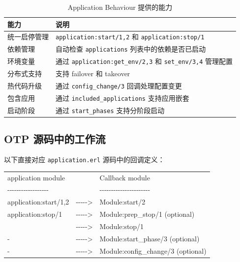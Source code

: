 \documentclass[a4paper,11pt]{article}
\begin{document}
\begin{table}[H]
\centering
\begin{tabular}{@{}ll@{}}
\toprule
\textbf{能力} & \textbf{说明} \\
\midrule
统一启停管理       & \texttt{application:start/1,2} 和 \texttt{application:stop/1} \\
依赖管理           & 自动检查 \texttt{applications} 列表中的依赖是否已启动 \\
环境变量           & 通过 \texttt{application:get\_env/2,3} 和 \texttt{set\_env/3,4} 管理配置 \\
分布式支持         & 支持 failover 和 takeover \\
热代码升级         & 通过 \texttt{config\_change/3} 回调处理配置变更 \\
包含应用           & 通过 \texttt{included\_applications} 支持应用嵌套 \\
启动阶段           & 通过 \texttt{start\_phases} 支持分阶段启动 \\
\bottomrule
\end{tabular}
\caption{Application Behaviour 提供的能力}
\end{table}

\subsection{OTP 源码中的工作流}

以下直接对应 \texttt{application.erl} 源码中的回调定义：

\begin{tcolorbox}[colback=codebg, colframe=codeborder, arc=2mm, boxrule=0.5pt,
                  title={\textbf{application.erl --- Callback Functions}},
                  fonttitle=\bfseries\ttfamily, width=\textwidth]
\small\ttfamily
\begin{tabular}{@{}lcl@{}}
application module &  & Callback module \\
\textsf{-{}-{}-{}-{}-{}-{}-{}-{}-{}-{}-{}-{}-{}-{}-{}-{}-{}-} & & \textsf{-{}-{}-{}-{}-{}-{}-{}-{}-{}-{}-{}-{}-{}-{}-{}-{}-{}-{}-{}-{}-{}-} \\
application:start/1,2         & -{}-{}-{}-{}-> & Module:start/2 \\
application:stop/1            & -{}-{}-{}-{}-> & Module:prep\_stop/1 (optional) \\
                              & -{}-{}-{}-{}-> & Module:stop/1 \\
-                             & -{}-{}-{}-{}-> & Module:start\_phase/3 (optional) \\
-                             & -{}-{}-{}-{}-> & Module:config\_change/3 (optional) \\
\end{tabular}
\end{tcolorbox}
\end{document}

